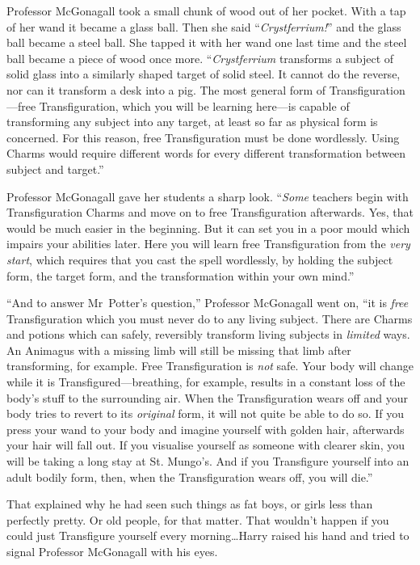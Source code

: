 Professor McGonagall took a small chunk of wood out of her pocket. With a tap of her wand it became a glass ball. Then she said “\emph{Crystferrium!}” and the glass ball became a steel ball. She tapped it with her wand one last time and the steel ball became a piece of wood once more. “\emph{Crystferrium} transforms a subject of solid glass into a similarly shaped target of solid steel. It cannot do the reverse, nor can it transform a desk into a pig. The most general form of Transfiguration—free Transfiguration, which you will be learning here—is capable of transforming any subject into any target, at least so far as physical form is concerned. For this reason, free Transfiguration must be done wordlessly. Using Charms would require different words for every different transformation between subject and target.”

Professor McGonagall gave her students a sharp look. “\emph{Some} teachers begin with Transfiguration Charms and move on to free Transfiguration afterwards. Yes, that would be much easier in the beginning. But it can set you in a poor mould which impairs your abilities later. Here you will learn free Transfiguration from the \emph{very start}, which requires that you cast the spell wordlessly, by holding the subject form, the target form, and the transformation within your own mind.”

“And to answer Mr~Potter’s question,” Professor McGonagall went on, “it is \emph{free} Transfiguration which you must never do to any living subject. There are Charms and potions which can safely, reversibly transform living subjects in \emph{limited} ways. An Animagus with a missing limb will still be missing that limb after transforming, for example. Free Transfiguration is \emph{not} safe. Your body will change while it is Transfigured—breathing, for example, results in a constant loss of the body’s stuff to the surrounding air. When the Transfiguration wears off and your body tries to revert to its \emph{original} form, it will not quite be able to do so. If you press your wand to your body and imagine yourself with golden hair, afterwards your hair will fall out. If you visualise yourself as someone with clearer skin, you will be taking a long stay at St. Mungo’s. And if you Transfigure yourself into an adult bodily form, then, when the Transfiguration wears off, you will die.”

That explained why he had seen such things as fat boys, or girls less than perfectly pretty. Or old people, for that matter. That wouldn’t happen if you could just Transfigure yourself every morning…Harry raised his hand and tried to signal Professor McGonagall with his eyes.

